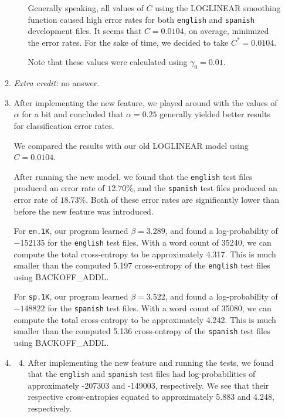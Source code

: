 \documentclass[11pt]{article}
\begin{document}
\begin{enumerate}
\begin{enumerate}[label=(\alph*)]
\begin{itemize}
			Generally speaking, all values of $C$ using the LOGLINEAR smoothing function caused high error rates for both \texttt{english} and \texttt{spanish} development files. It seems that $C = 0.0104$, on average, minimized the error rates. For the sake of time, we decided to take $C^* = 0.0104$.

			Note that these values were calculated using $\gamma_0 = 0.01$.

		\end{itemize} \vspace{8pt}


	\item %
		\textit{Extra credit:} no answer.
	\item %

		After implementing the new feature, we played around with the values of $\alpha$ for a bit and concluded that $\alpha=0.25$ generally yielded better results for classification error rates. 

		We compared the results with our old LOGLINEAR model using $C = 0.0104$.

		After running the new model, we found that the \texttt{english} test files produced an error rate of $12.70\%$, and the \texttt{spanish} test files produced an error rate of $18.73\%$. Both of these error rates are significantly lower than before the new feature was introduced.

		For \texttt{en.1K}, our program learned $\beta = 3.289$, and found a log-probability of $-152135$ for the \texttt{english} test files. With a word count of 35240, we can compute the total cross-entropy to be approximately 4.317. This is much smaller than the computed 5.197 cross-entropy of the \texttt{english} test files using BACKOFF\_ADDL.

		For \texttt{sp.1K}, our program learned $\beta = 3.522$, and found a log-probability of $-148822$ for the \texttt{spanish} test files. With a word count of 35080, we can compute the total cross-entropy to be approximately 4.242. This is much smaller than the computed 5.136 cross-entropy of the \texttt{spanish} test files using BACKOFF\_ADDL.

	\item %
		\begin{enumerate}[label=\roman*.]
		\setcounter{enumiii}{3}
		\item %

			After implementing the new feature and running the tests, we found that the \texttt{english} and \texttt{spanish} test files had log-probabilities of approximately -207303 and -149003, respectively. We see that their respective cross-entropies equated to approximately 5.883 and 4.248, respectively. 


\end{enumerate}
\end{enumerate}
\end{enumerate}
\end{document}
